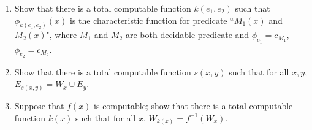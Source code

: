 \documentclass[12pt,a4paper]{article}
\theoremstyle{definition}
\numberwithin{equation}{section}
\numberwithin{figure}{section}
\begin{document}
\begin{enumerate}
\item Show that there is a total computable function $k(e_1, e_2)$ such that $\phi_{k(e_1,e_2)}(x)$ is the characteristic function for predicate ``$M_1(x)$ and $M_2(x)$", where $M_1$ and $M_2$ are both decidable predicate and $\phi_{e_1}=c_{M_1}$,  $\phi_{e_2}=c_{M_2}$.
\item Show that there is a total computable function $s(x,y)$ such that for all $x,y$, $E_{s(x,y)}=W_x \cup E_y$.

\item Suppose that $f(x)$ is computable; show that there is a total computable function $k(x)$ such that for all $x$, $W_{k(x)}=f^{-1}(W_x)$.

\end{enumerate}



\end{document}
